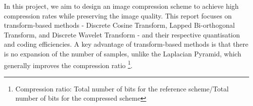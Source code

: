 In this project, we aim to design an image compression scheme to achieve high compression rates while preserving the image quality. This report focuses on transform-based methods - Discrete Cosine Transform, Lapped Bi-orthogonal Transform, and Discrete Wavelet Transform - and their respective quantisation and coding efficiencies. A key advantage of transform-based methods is that there is no expansion of the number of samples, unlike the Laplacian Pyramid, which generally improves the compression ratio \footnote{Compression ratio: Total number of bits for the reference scheme/Total number of bits for the compressed scheme}.
\vspace{-2mm}